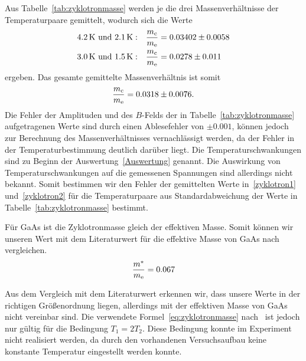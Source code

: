 \documentclass[paper=a4,fontsize=10pt,DIV=18,twocolumn,parskip=half]{scrartcl}
\numberwithin{equation}{section}    %
\begin{document}
Aus Tabelle~\ref{tab:zyklotronmasse} werden je die drei Massenverhältnisse der Temperaturpaare gemittelt, wodurch sich die Werte
\begin{align}
	\SI{4.2}{\kelvin}\text{ und }\SI{2.1}{\kelvin}: && \frac{m_{\rm c}}{m_{\rm e}} &= 0.03402 \pm 0.0058 \label{zyklotron1}\\
	\SI{3.0}{\kelvin}\text{ und }\SI{1.5}{\kelvin}: && \frac{m_{\rm c}}{m_{\rm e}} &= 0.0278 \pm 0.011 \label{zyklotron2}
\end{align}
ergeben. Das gesamte gemittelte Massenverhältnis ist somit
\begin{equation}
	\frac{m_{\rm c}}{m_{\rm e}} = 0.0318 \pm 0.0076.
	\label{zyklotronmasse}
\end{equation}
Die Fehler der Amplituden und des $B$-Felds der in Tabelle~\ref{tab:zyklotronmasse} aufgetragenen Werte sind durch einen Ablesefehler von $\pm 0.001$, können jedoch zur Berechnung des Massenverhältnisses vernachlässigt werden, da der Fehler in der Temperaturbestimmung deutlich darüber liegt. Die Temperaturschwankungen sind zu Beginn der Auswertung~\ref{Auswertung} genannt. Die Auswirkung von Temperaturschwankungen auf die gemessenen Spannungen sind allerdings nicht bekannt. Somit bestimmen wir den Fehler der gemittelten Werte in~\eqref{zyklotron1} und~\eqref{zyklotron2} für die Temperaturpaare aus Standardabweichung der Werte in Tabelle~\ref{tab:zyklotronmasse} bestimmt.

Für GaAs ist die Zyklotronmasse gleich der effektiven Masse. Somit können wir unseren Wert mit dem Literaturwert für die effektive Masse von GaAs nach~\citet{saarland} vergleichen.
\begin{equation}
	\frac{m^*}{m_{\rm e}} = 0.067
\end{equation}

Aus dem Vergleich mit dem Literaturwert erkennen wir, dass unsere Werte in der richtigen Größenordnung liegen, allerdings mit der effektiven Masse von GaAs nicht vereinbar sind. Die verwendete Formel~\eqref{eq:zyklotronmasse} nach~\citet{ando} ist jedoch nur gültig für die Bedingung $T_1=2T_2$. Diese Bedingung konnte im Experiment nicht realisiert werden, da durch den vorhandenen Versuchsaufbau keine konstante Temperatur eingestellt werden konnte. 

%
%
~~~~~~~~~~~~~~~~~~~~~~~~~~~~~~~~~~~~~~~~~~~~~~~~~~~~~~~~~~~~~~~~~~~~~~~~~~~~~
\end{document}

